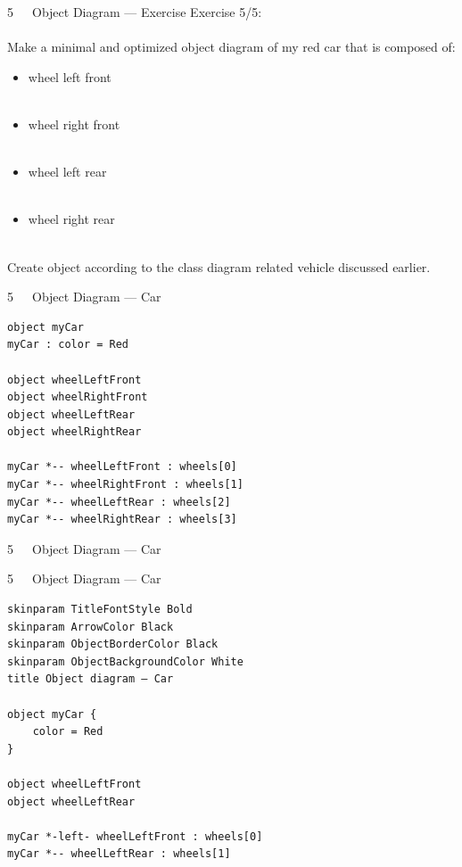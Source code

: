 \documentclass{beamer}
\begin{document}
\begin{frame}{5~~~Object Diagram — Exercise}
Exercise 5/5:
\\\mbox{}\\
Make a minimal and optimized object diagram of my red car that is composed of:
\\\mbox{}
\begin{itemize}
\item wheel left front
\\\mbox{}\\
\item wheel right front
\\\mbox{}\\
\item wheel left rear
\\\mbox{}\\
\item wheel right rear
\end{itemize}
\mbox{}\\
Create object according to the class diagram related vehicle discussed earlier.
\end{frame}

\begin{frame}[fragile]{5~~~Object Diagram — Car}
\begin{verbatim}
object myCar
myCar : color = Red

object wheelLeftFront
object wheelRightFront
object wheelLeftRear
object wheelRightRear

myCar *-- wheelLeftFront : wheels[0]
myCar *-- wheelRightFront : wheels[1]
myCar *-- wheelLeftRear : wheels[2]
myCar *-- wheelRightRear : wheels[3]
\end{verbatim}
\end{frame}

\begin{frame}{5~~~Object Diagram — Car}
\begin{figure}
\def\centering\svgwidth{\textwidth}
\resizebox{1.2\textwidth}{!}{}
\end{figure}
\end{frame}

\begin{frame}[fragile]{5~~~Object Diagram — Car}
\begin{verbatim}
skinparam TitleFontStyle Bold
skinparam ArrowColor Black
skinparam ObjectBorderColor Black
skinparam ObjectBackgroundColor White
title Object diagram — Car

object myCar {
    color = Red
}

object wheelLeftFront
object wheelLeftRear

myCar *-left- wheelLeftFront : wheels[0]
myCar *-- wheelLeftRear : wheels[1]
\end{verbatim}
\end{frame}
\end{document}
